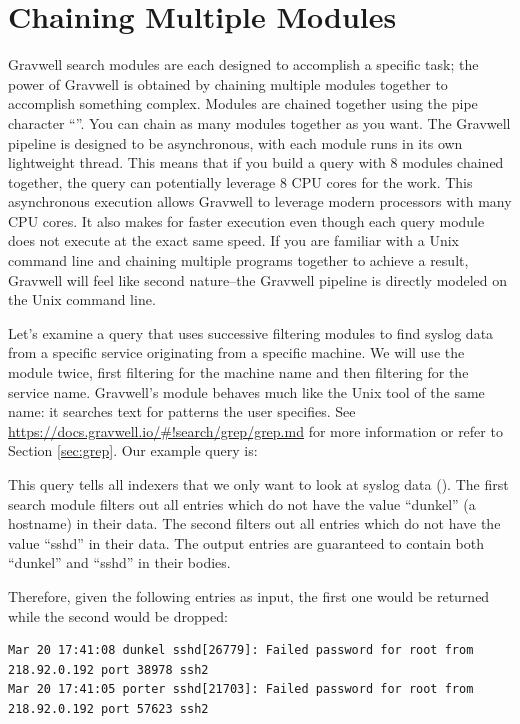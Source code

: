 \clearpage
\section{Chaining Multiple Modules}

Gravwell search modules are each designed to accomplish a specific
task; the power of Gravwell is obtained by chaining multiple modules
together to accomplish something complex. Modules are chained together
using the pipe character ``\textbar{}''. You can chain as many modules
together as you want. The Gravwell pipeline is designed to be
asynchronous, with each module runs in its own lightweight thread. This
means that if you build a query with 8 modules chained together, the
query can potentially leverage 8 CPU cores for the work. This
asynchronous execution allows Gravwell to leverage modern processors
with many CPU cores. It also makes for faster execution even though each
query module does not execute at the exact same speed. If you are
familiar with a Unix command line and chaining multiple programs
together to achieve a result, Gravwell will feel like second
nature--the Gravwell pipeline is directly modeled on the Unix command
line.

Let's examine a query that uses successive filtering modules to find
syslog data from a specific service originating from a specific machine.
We will use the
 module
twice, first filtering for the machine name and then filtering for the
service name. Gravwell's  module behaves much like the Unix tool of the same name: it searches text for patterns the user specifies. See \href{https://docs.gravwell.io/\#!search/grep/grep.md}{https://docs.gravwell.io/\#!search/grep/grep.md} for more information or refer to Section \ref{sec:grep}. Our example query is:


This query tells all indexers that we only want to look at syslog
data (). The first  search module filters out all entries which do not
have the value ``dunkel'' (a hostname) in their data. The second  filters out all
entries which do not have the value ``sshd'' in their data. The output
entries are guaranteed to contain both ``dunkel'' and ``sshd'' in their
bodies.

Therefore, given the following entries as input, the first one would be returned while the second would be dropped:

\begin{Verbatim}[breaklines=true]
Mar 20 17:41:08 dunkel sshd[26779]: Failed password for root from 218.92.0.192 port 38978 ssh2
Mar 20 17:41:05 porter sshd[21703]: Failed password for root from 218.92.0.192 port 57623 ssh2
\end{Verbatim}

